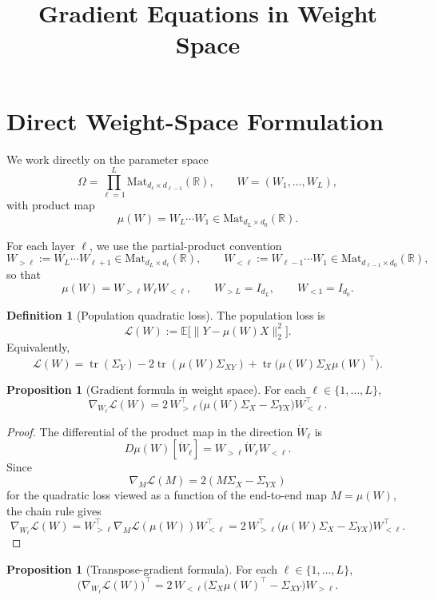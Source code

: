 \documentclass{article}
\title{Gradient Equations in Weight Space}
\date{}
\newcommand{\Mat}{\mathrm{Mat}}
\newcommand{\tr}{\operatorname{tr}}
\theoremstyle{definition}
\newtheorem{proposition}[theorem]{Proposition}
\newtheorem{definition}[theorem]{Definition}
\begin{document}
\maketitle

\section{Direct Weight-Space Formulation}

We work directly on the parameter space
\[
\Omega = \prod_{\ell=1}^L \Mat_{d_\ell\times d_{\ell-1}}(\mathbb R),
\qquad
W=(W_1,\dots,W_L),
\]
with product map
\[
\mu(W)=W_L\cdots W_1 \in \Mat_{d_L\times d_0}(\mathbb R).
\]

For each layer $\ell$, we use the partial-product convention
\[
W_{>\ell}:=W_L\cdots W_{\ell+1}\in \Mat_{d_L\times d_\ell}(\mathbb R),
\qquad
W_{<\ell}:=W_{\ell-1}\cdots W_1\in \Mat_{d_{\ell-1}\times d_0}(\mathbb R),
\]
so that
\[
\mu(W)=W_{>\ell}W_\ell W_{<\ell},
\qquad
W_{>L}=I_{d_L},
\qquad
W_{<1}=I_{d_0}.
\]

\begin{definition}[Population quadratic loss]
The population loss is
\[
\mathcal L(W)
:=
\mathbb E \bigl[\|Y-\mu(W)X\|_2^2\bigr].
\]
Equivalently,
\[
\mathcal L(W)
=
\tr(\Sigma_Y)-2\tr(\mu(W)\Sigma_{XY})+\tr\bigl(\mu(W)\Sigma_X\mu(W)^\top\bigr).
\]
\end{definition}

\begin{proposition}[Gradient formula in weight space]
For each $\ell\in\{1,\dots,L\}$,
\[
\nabla_{W_\ell}\mathcal L(W)
=
2\,W_{>\ell}^{\top}\bigl(\mu(W)\Sigma_X-\Sigma_{YX}\bigr)W_{<\ell}^{\top}.
\]
\end{proposition}

\begin{proof}
The differential of the product map in the direction $\dot W_\ell$ is
\[
D\mu(W)[\dot W_\ell]
=
W_{>\ell}\dot W_\ell W_{<\ell}.
\]
Since
\[
\nabla_M\mathcal L(M)=2(M\Sigma_X-\Sigma_{YX})
\]
for the quadratic loss viewed as a function of the end-to-end map $M=\mu(W)$, the chain rule gives
\[
\nabla_{W_\ell}\mathcal L(W)
=
W_{>\ell}^{\top}\nabla_M\mathcal L(\mu(W))W_{<\ell}^{\top}
=
2\,W_{>\ell}^{\top}\bigl(\mu(W)\Sigma_X-\Sigma_{YX}\bigr)W_{<\ell}^{\top}.
\]
\end{proof}

\begin{proposition}[Transpose-gradient formula]
For each $\ell\in\{1,\dots,L\}$,
\[
\bigl(\nabla_{W_\ell}\mathcal L(W)\bigr)^\top
=
2\,W_{<\ell}\bigl(\Sigma_X\mu(W)^\top-\Sigma_{XY}\bigr)W_{>\ell}.
\]
\end{proposition}
\end{document}
